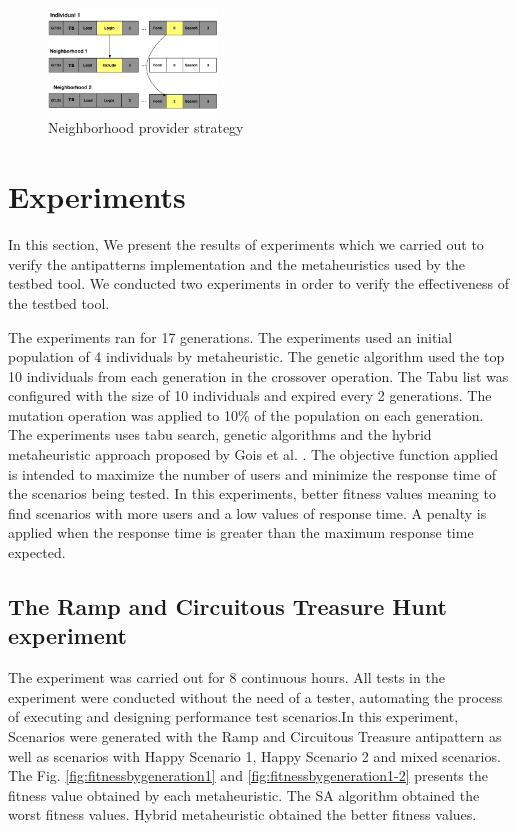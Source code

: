 \begin{figure}[h]
\centering
\includegraphics[width=0.4\textwidth]{./images/neighbor.png}
\caption{Neighborhood provider strategy}
\label{fig:neighbourtaby}
\end{figure}


\FloatBarrier
\section{Experiments}

In this section, We present the results of experiments which we carried out to verify the antipatterns  implementation and the metaheuristics used by the testbed tool. We conducted two experiments in order to verify the effectiveness of the testbed tool.

The experiments ran for 17 generations. The experiments used an initial population of 4 individuals by metaheuristic. The genetic algorithm used the top 10 individuals from each generation in the crossover operation. The Tabu list was configured with the size of 10 individuals and expired every 2 generations.  The mutation operation was applied to 10\% of the population on each generation. The experiments uses tabu search, genetic algorithms and the hybrid metaheuristic approach proposed by Gois et al. \cite{Gois2016}. The objective function applied is intended to maximize the number of users and minimize the response time of the scenarios being tested.  In this experiments, better fitness values meaning to find scenarios with more users and a low values of response time. A penalty is applied when the response time is greater than the  maximum response time expected. 

\subsection{The Ramp and Circuitous Treasure Hunt experiment}

The experiment was carried out for 8 continuous hours.  All tests in the experiment were conducted without the need of a tester, automating the process of executing and designing performance test scenarios.In this experiment, Scenarios were generated with the Ramp and Circuitous Treasure antipattern as well as scenarios with Happy Scenario 1, Happy Scenario 2 and mixed scenarios. The Fig. \ref{fig:fitnessbygeneration1} and \ref{fig:fitnessbygeneration1-2} presents the fitness value obtained by each metaheuristic. The SA algorithm obtained the worst fitness values. Hybrid metaheuristic obtained the better fitness values. 


